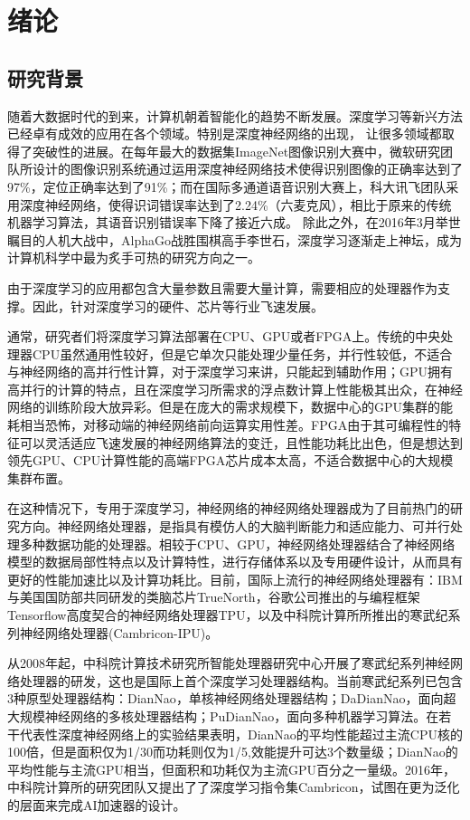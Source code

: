 ﻿\chapter{绪论}
\section{研究背景}
随着大数据时代的到来，计算机朝着智能化的趋势不断发展。深度学习等新兴方法已经卓有成效的应用在各个领域。特别是深度神经网络的出现，
让很多领域都取得了突破性的进展。在每年最大的数据集ImageNet图像识别大赛中\cite{russakovsky2015imagenet}，微软研究团队所设计的图像识别系统通过运用深度神经网络技术使得识别图像的正确率达到了97\%，定位正确率达到了91\%；而在国际多通道语音识别大赛上，科大讯飞团队采用深度神经网络，使得识词错误率达到了2.24\%（六麦克风），相比于原来的传统机器学习算法，其语音识别错误率下降了接近六成。 除此之外，在2016年3月举世瞩目的人机大战中\cite{wang2016does}，AlphaGo战胜围棋高手李世石，深度学习逐渐走上神坛，成为计算机科学中最为炙手可热的研究方向之一。

由于深度学习的应用都包含大量参数且需要大量计算，需要相应的处理器作为支撑。因此，针对深度学习的硬件、芯片等行业飞速发展。

通常，研究者们将深度学习算法部署在CPU、GPU或者FPGA上。传统的中央处理器CPU虽然通用性较好，但是它单次只能处理少量任务，并行性较低，不适合与神经网络的高并行性计算，对于深度学习来讲，只能起到辅助作用；GPU拥有高并行的计算的特点，且在深度学习所需求的浮点数计算上性能极其出众，在神经网络的训练阶段大放异彩。但是在庞大的需求规模下，数据中心的GPU集群的能耗相当恐怖，对移动端的神经网络前向运算实用性差。FPGA由于其可编程性的特征可以灵活适应飞速发展的神经网络算法的变迁，且性能功耗比出色，但是想达到领先GPU、CPU计算性能的高端FPGA芯片成本太高，不适合数据中心的大规模集群布置。

在这种情况下，专用于深度学习，神经网络的神经网络处理器成为了目前热门的研究方向。神经网络处理器，是指具有模仿人的大脑判断能力和适应能力、可并行处理多种数据功能的处理器。相较于CPU、GPU，神经网络处理器结合了神经网络模型的数据局部性特点以及计算特性，进行存储体系以及专用硬件设计，从而具有更好的性能加速比以及计算功耗比。目前，国际上流行的神经网络处理器有：IBM与美国国防部共同研发的类脑芯片TrueNorth\cite{akopyan2015truenorth}，谷歌公司推出的与编程框架Tensorflow\cite{abadi2016tensorflow}高度契合的神经网络处理器TPU\cite{jouppi2017datacenter}，以及中科院计算所所推出的寒武纪系列神经网络处理器(Cambricon-IPU)\cite{chen2016diannao}。

从2008年起，中科院计算技术研究所智能处理器研究中心开展了寒武纪系列神经网络处理器的研发，这也是国际上首个深度学习处理器结构。当前寒武纪系列已包含3种原型处理器结构：DianNao\cite{chen2014diannao}，单核神经网络处理器结构；DaDianNao\cite{chen2014dadiannao}，面向超大规模神经网络的多核处理器结构；PuDianNao\cite{liu2015pudiannao}，面向多种机器学习算法。在若干代表性深度神经网络上的实验结果表明，DianNao的平均性能超过主流CPU核的100倍，但是面积仅为1/30而功耗则仅为1/5,效能提升可达3个数量级；DianNao的平均性能与主流GPU相当，但面积和功耗仅为主流GPU百分之一量级。2016年，中科院计算所的研究团队又提出了了深度学习指令集Cambricon\cite{liu2016cambricon}，试图在更为泛化的层面来完成AI加速器的设计。

